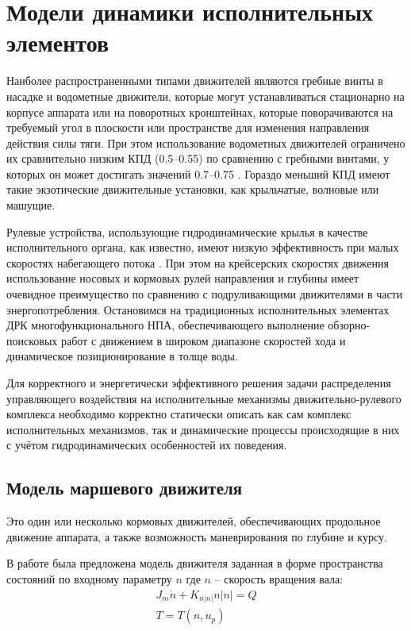 \section{Модели динамики исполнительных элементов}\label{sec:Propulsion/Models}
Наиболее распространенными типами движителей являются гребные винты в насадке и водометные движители, которые могут устанавливаться стационарно на корпусе аппарата или на поворотных кронштейнах, которые поворачиваются на требуемый угол в плоскости или пространстве для изменения направления действия силы тяги.
При этом использование водометных движителей ограничено их сравнительно низким КПД (0.5–0.55) по сравнению с гребными винтами, у которых он может достигать значений 0.7–0.75 \cite{инзарцев2018подводные}. Гораздо меньший КПД имеют такие экзотические движительные установки, как крыльчатые, волновые или машущие. 

Рулевые устройства, использующие гидродинамические крылья в качестве исполнительного органа, как известно, имеют низкую эффективность при малых скоростях набегающего потока \cite{агеев2015авто}.
При этом на крейсерских скоростях движения использование носовых и кормовых рулей направления и глубины имеет очевидное преимущество по сравнению с подруливающими движителями в части энергопотребления.
Остановимся на традиционных исполнительных элементах ДРК многофункционального НПА, обеспечивающего выполнение обзорно-поисковых работ с движением в широком диапазоне скоростей хода и динамическое позиционирование в толще воды.

Для корректного и энергетически эффективного решения задачи распределения управляющего воздействия на исполнительные механизмы движительно-рулевого комплекса необходимо корректно статически описать как сам комплекс исполнительных механизмов, так и динамические процессы происходящие в них с учётом гидродинамических особенностей их поведения.

\subsection{Модель маршевого движителя}
Это один или несколько кормовых движителей, обеспечивающих продольное движение аппарата, а также возможность маневрирования по глубине и курсу.

В работе \cite{10.1109/48.107145} была предложена модель движителя заданная в форме пространства состояний по входному параметру $n$ где $n$ -- скорость вращения вала:
\begin{gather}
    \label{eq:thruster_dynamic_1}
    J_m\dot{n} + K_{n|n|}n|n| = Q \\
    T = T(n, u_p)
\end{gather}

